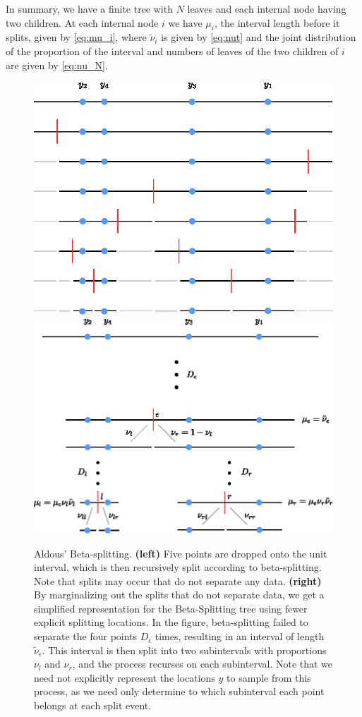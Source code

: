 \documentclass{bioinfo}
\newcommand{\nut}{\tilde{\nu}}
\begin{document}
\begin{methods}
In summary, we have a finite tree with $N$ leaves and each internal node having two children.  At each internal node $i$ we have $\mu_i$, the interval length before it splits, given by \eqref{eq:mu_i}, where $\nut_i$ is given by \eqref{eq:nut} and the joint distribution of the proportion of the interval and numbers of leaves of the two children of $i$ are given by \eqref{eq:nu_N}.

\begin{figure}
\centering
\includegraphics[width=0.9\columnwidth]{../figures/aldous_betasplit_full.eps}
\includegraphics[width=0.974\columnwidth]{../figures/aldous_betasplit_marginalB.eps}
\caption{Aldous' Beta-splitting.  \textbf{(left)} Five points are dropped onto the unit interval, which is then recursively split according to beta-splitting.  Note that splits may occur that do not separate any data. \textbf{(right)} By marginalizing out the splits that do not separate data, we get a simplified representation for the Beta-Splitting tree using fewer explicit splitting locations.  In the figure, beta-splitting failed to separate the four points $D_\epsilon$ times, resulting in an interval of length $\nut_\epsilon$.  This interval is then split into two subintervals with proportions $\nu_l$ and $\nu_r$, and the process recurses on each subinterval.  Note that we need not explicitly represent the locations $y$ to sample from this process, as we need only determine to which subinterval each point belongs at each split event.}

\end{figure}
\end{methods}
\end{document}
